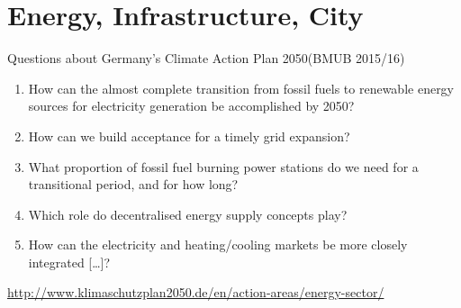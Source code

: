 
\section{Energy, Infrastructure, City}
\frame{\sectionpage}

\begin{frame}
    \titlewithlogo[Motivation]
    \begin{alertblock}{Questions about Germany's Climate Action Plan 2050\hfill (BMUB 2015/16)}
    \begin{enumerate}[<+->]\itemsep9pt
    \item How can the almost complete transition from fossil fuels to renewable energy sources for electricity generation be accomplished by 2050?
    \item How can we build acceptance for a timely grid expansion?
    \item What proportion of fossil fuel burning power stations do we need for a transitional period, and for how long?
    \item Which role do decentralised energy supply concepts play?
    \item How can the electricity and heating/cooling markets be more closely integrated [\dots]?
    \end{enumerate}
    \end{alertblock}

    \tiny
    \hspace{3.75em}\url{http://www.klimaschutzplan2050.de/en/action-areas/energy-sector/}
\end{frame}

